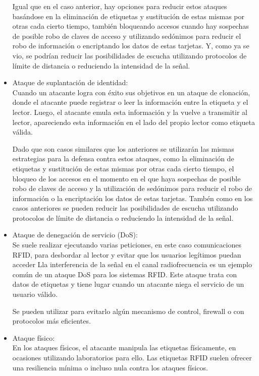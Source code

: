 \documentclass[12pt,a4paper,onecolumn,oneside]{report}
\begin{document}
\begin{itemize}
Igual que en el caso anterior, hay opciones para reducir estos ataques basándose en la eliminación de etiquetas y sustitución de estas mismas por otras cada cierto tiempo, también bloqueando accesos cuando hay sospechas de posible robo de claves de acceso y utilizando sedónimos para reducir el robo de información o encriptando los datos de estas tarjetas. Y, como ya se vio, se podrían reducir las posibilidades de escucha utilizando protocolos de límite de distancia o reduciendo la intensidad de la señal.

\item Ataque de suplantación de identidad:\\
Cuando un atacante logra con éxito sus objetivos en un ataque de clonación, donde el atacante puede registrar o leer la información entre la etiqueta y el lector. Luego, el atacante emula esta información y la vuelve a transmitir al lector, apareciendo esta información en el lado del propio lector como etiqueta válida.

Dado que son casos similares que los anteriores se utilizarán las mismas estrategias para la defensa contra estos ataques, como la eliminación de etiquetas y sustitución de estas mismas por otras cada cierto tiempo, el bloqueo de los accesos en el momento en el que haya sospechas de posible robo de claves de acceso y la utilización de sedónimos para reducir el robo de información o la encriptación los datos de estas tarjetas. Tambén como en los casos anteriores se pueden reducir las posibilidades de escucha utilizando protocolos de límite de distancia o reduciendo la intensidad de la señal.

\item Ataque de denegación de servicio (DoS):\\
Se suele realizar ejecutando varias peticiones, en este caso comunicaciones RFID, para desbordar al lector y evitar que los usuarios legítimos puedan acceder Lla interferencia de la señal en el canal radiofrecuencia es un ejemplo común de un ataque DoS para los sistemas RFID. Este ataque trata con datos de etiquetas y tiene lugar cuando un atacante niega el servicio de un usuario válido.

Se pueden utilizar para evitarlo algún mecanismo de control, firewall o con protocolos más eficientes.

\item Ataque físico:\\
En los ataques físicos, el atacante manipula las etiquetas físicamente, en ocasiones utilizando laboratorios para ello. Las etiquetas RFID suelen ofrecer una resiliencia mínima o incluso nula contra los ataques físicos. 


\end{itemize}
\end{document}
